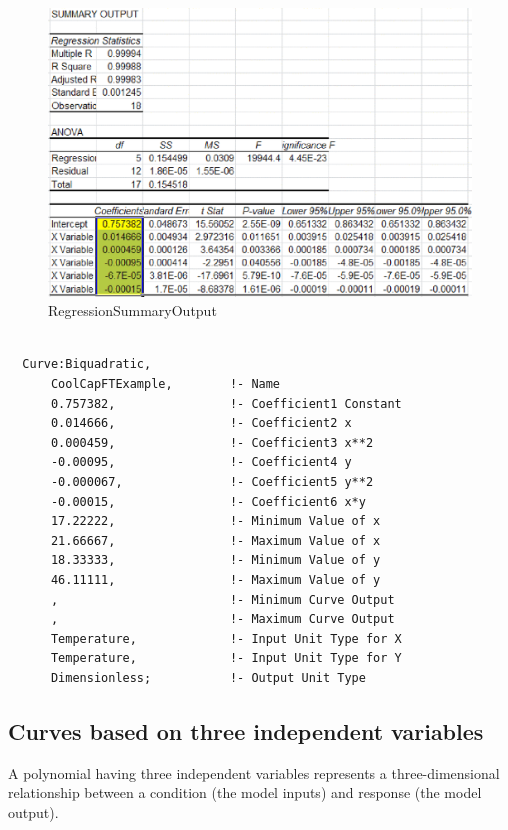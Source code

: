 \begin{figure}[htbp]
\centering
\includegraphics{media/image7867.png}
\caption{RegressionSummaryOutput}
\end{figure}

\begin{lstlisting}

  Curve:Biquadratic,
      CoolCapFTExample,        !- Name
      0.757382,                !- Coefficient1 Constant
      0.014666,                !- Coefficient2 x
      0.000459,                !- Coefficient3 x**2
      -0.00095,                !- Coefficient4 y
      -0.000067,               !- Coefficient5 y**2
      -0.00015,                !- Coefficient6 x*y
      17.22222,                !- Minimum Value of x
      21.66667,                !- Maximum Value of x
      18.33333,                !- Minimum Value of y
      46.11111,                !- Maximum Value of y
      ,                        !- Minimum Curve Output
      ,                        !- Maximum Curve Output
      Temperature,             !- Input Unit Type for X
      Temperature,             !- Input Unit Type for Y
      Dimensionless;           !- Output Unit Type
\end{lstlisting}

\subsection{Curves based on three independent variables}\label{curves-based-on-three-independent-variables}

A polynomial having three independent variables represents a three-dimensional relationship between a condition (the model inputs) and response (the model output).

